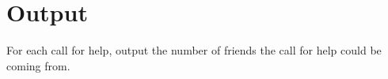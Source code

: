 


\section*{Output}
For each call for help, output the number of friends the call for help could be coming from.
